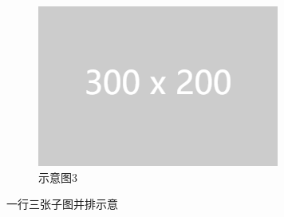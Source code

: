 \documentclass[zihao=-4]{ctexart}
\begin{document}
\begin{spacing}{1.5}
\begin{figure}[htbp]
\begin{subfigure}{0.31\textwidth}
    \includegraphics[width=\linewidth]{example-image-1.png}
    \caption{示意图3} \label{fig:9ccc}
    \end{subfigure}
\caption{一行三张子图并排示意}
\label{qmix-train}
\end{figure}



\end{spacing}
\end{document}
